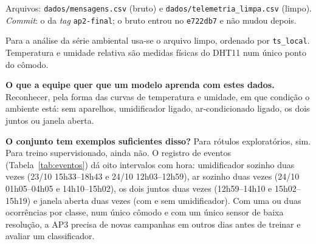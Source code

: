 \noindent Arquivos: \texttt{dados/mensagens.csv} (bruto) e \texttt{dados/telemetria\_limpa.csv} (limpo).\\ \emph{Commit}: o da \emph{tag} \texttt{ap2-final}; o bruto entrou no \texttt{e722db7} e não mudou depois.\par
Para a análise da série ambiental usa-se o arquivo limpo, ordenado por \texttt{ts\_local}. Temperatura e umidade relativa são medidas físicas do DHT11 num único ponto do cômodo.\par
\noindent\textbf{O que a equipe quer que um modelo aprenda com estes dados.} Reconhecer, pela forma das curvas de temperatura e umidade, em que condição o ambiente está: sem aparelhos, umidificador ligado, ar-condicionado ligado, os dois juntos ou janela aberta.\par
\noindent\textbf{O conjunto tem exemplos suficientes disso?} Para rótulos exploratórios, sim. Para treino supervisionado, ainda não. O registro de eventos (Tabela~\ref{tab:eventos}) dá oito intervalos com hora: umidificador sozinho duas vezes (23/10 15h33--18h43 e 24/10 12h03--12h59), ar sozinho duas vezes (24/10 01h05--04h05 e 14h10--15h02), os dois juntos duas vezes (12h59--14h10 e 15h02--15h19) e janela aberta duas vezes (com e sem umidificador). Com uma ou duas ocorrências por classe, num único cômodo e com um único sensor de baixa resolução, a AP3 precisa de novas campanhas em outros dias antes de treinar e avaliar um classificador.
